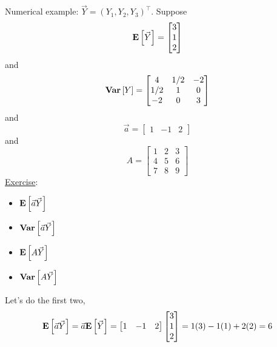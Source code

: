 Numerical example: $ \vec{Y}=(Y_1,Y_2,Y_3)^\top $. Suppose
\[ \bm{\mathrm{E}}\left[\vec{Y}\right]=\begin{bmatrix}
        3 \\
        1 \\
        2
    \end{bmatrix} \]
and
\[ \bm{\mathrm{Var}}\left[Y\right]=\begin{bmatrix}
        4   & 1/2 & -2 \\
        1/2 & 1   & 0  \\
        -2  & 0   & 3
    \end{bmatrix} \]
and
\[ \vec{a}=\begin{bmatrix}
        1 & -1 & 2
    \end{bmatrix} \]
and
\[ A=\begin{bmatrix}
        1 & 2 & 3 \\
        4 & 5 & 6 \\
        7 & 8 & 9
    \end{bmatrix} \]
\underline{Exercise}:
\begin{itemize}
    \item $ \bm{\mathrm{E}}\left[\vec{a}\vec{Y}\right] $
    \item $ \bm{\mathrm{Var}}\left[\vec{a}\vec{Y}\right] $
    \item $ \bm{\mathrm{E}}\left[A\vec{Y}\right] $
    \item $ \bm{\mathrm{Var}}\left[A\vec{Y}\right] $
\end{itemize}
Let's do the first two,
\[ \bm{\mathrm{E}}\left[\vec{a}\vec{Y}\right]=\vec{a}\bm{\mathrm{E}}\left[\vec{Y}\right]=
    \begin{bmatrix}
        1 & -1 & 2
    \end{bmatrix}\begin{bmatrix}
        3 \\
        1 \\
        2
    \end{bmatrix}=1(3)-1(1)+2(2)=6 \]
